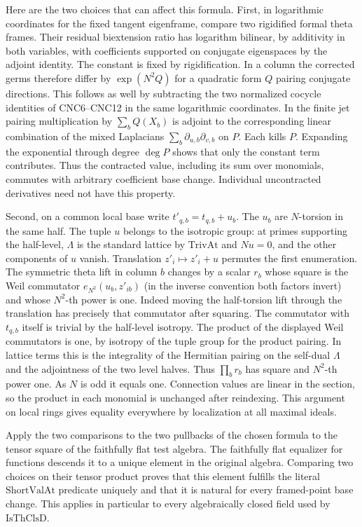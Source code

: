 Here are the two choices that can affect this formula. First, in
logarithmic coordinates for the fixed tangent eigenframe, compare
two rigidified formal theta frames. Their residual biextension ratio
has logarithm bilinear, by additivity in both variables, with
coefficients supported on conjugate eigenspaces by the adjoint
identity. The constant is fixed by rigidification. In a column the
corrected germs therefore differ by $\exp(N^2 Q)$ for a quadratic
form $Q$ pairing conjugate directions. This follows as well by
subtracting the two normalized cocycle identities of CNC6--CNC12
in the same logarithmic coordinates. In the finite jet pairing
multiplication by $\sum_b Q(X_b)$ is adjoint to the corresponding
linear combination of the mixed Laplacians
$\sum_b\partial_{u,b}\partial_{v,b}$ on $P$. Each kills $P$.
Expanding the exponential through degree $\deg P$ shows that only
the constant term contributes. Thus the contracted value, including
its sum over monomials, commutes with arbitrary coefficient base
change. Individual uncontracted derivatives need not have this
property.

Second, on a common local base write $t'_{q,b}=t_{q,b}+u_b$.
The $u_b$ are $N$-torsion in the same half. The tuple $u$ belongs
to the isotropic group: at primes supporting the half-level,
$\Lambda$ is the standard lattice by $\mathrm{TrivAt}$ and
$Nu=0$, and the other components of $u$ vanish. Translation
$z'_i\mapsto z'_i+u$ permutes the first enumeration. The symmetric
theta lift in column $b$ changes by a scalar $r_b$ whose square is
the Weil commutator $e_{N^2}(u_b,z'_{ib})$ (in the inverse convention
both factors invert) and whose $N^2$-th power is one. Indeed moving
the half-torsion lift through the translation has precisely that
commutator after squaring. The commutator with $t_{q,b}$ itself
is trivial by the half-level isotropy. The product of the displayed
Weil commutators is one, by isotropy of the tuple group for the
product pairing. In lattice terms this is the integrality of the
Hermitian pairing on the self-dual $\Lambda$ and the adjointness
of the two level halves. Thus $\prod_b r_b$ has square and
$N^2$-th power one. As $N$ is odd it equals one. Connection values
are linear in the section, so the product in each monomial is
unchanged after reindexing. This argument on local rings gives
equality everywhere by localization at all maximal ideals.

Apply the two comparisons to the two pullbacks of the chosen
formula to the tensor square of the faithfully flat test algebra.
The faithfully flat equalizer for functions descends it to a
unique element in the original algebra. Comparing two choices
on their tensor product proves that this element fulfills the
literal $\mathrm{ShortValAt}$ predicate uniquely and that it is
natural for every framed-point base change. This applies in
particular to every algebraically closed field used by
$\mathrm{IsThClsD}$.

